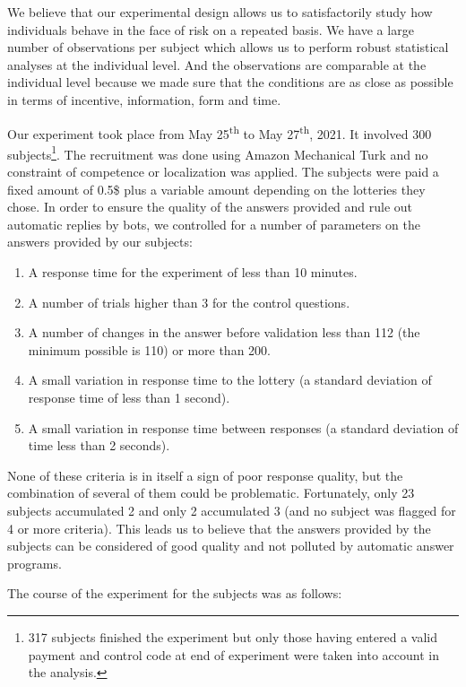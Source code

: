 \documentclass[
]{book}
\providecommand{\tightlist}{%
  \setlength{\itemsep}{0pt}\setlength{\parskip}{0pt}}
\begin{document}
We believe that our experimental design allows us to satisfactorily
study how individuals behave in the face of risk on a repeated basis. We
have a large number of observations per subject which allows us to
perform robust statistical analyses at the individual level. And the
observations are comparable at the individual level because we made sure
that the conditions are as close as possible in terms of incentive,
information, form and time.

Our experiment took place from May 25\textsuperscript{th} to May 27\textsuperscript{th}, 2021.
It involved 300 subjects\footnote{317 subjects finished the experiment but only those
  having entered a valid payment and control code at end of experiment were taken into
  account in the analysis.}.
The recruitment was done using Amazon Mechanical Turk and no
constraint of competence or localization was applied.
The subjects were
paid a fixed amount of 0.5\$ plus a variable amount depending on the
lotteries they chose.
In order to ensure the quality of the answers provided
and rule out automatic replies by bots,
we controlled for a number of parameters on the answers provided by
our subjects:

\begin{enumerate}
\def\labelenumi{\arabic{enumi}.}
\tightlist
\item
  A response time for the experiment of less than 10 minutes.
\item
  A number of trials higher than 3 for the control questions.
\item
  A number of changes in the answer before validation less than 112
  (the minimum possible is 110) or more than 200.
\item
  A small variation in response time to the lottery (a standard
  deviation of response time of less than 1 second).
\item
  A small variation in response time between responses (a standard
  deviation of time less than 2 seconds).
\end{enumerate}

None of these criteria is in itself a sign of poor response quality, but
the combination of several of them could be problematic.
Fortunately, only 23 subjects accumulated 2 and only 2 accumulated 3 (and no
subject was flagged for 4 or more criteria).
This leads us to believe that the answers provided by the
subjects can be considered of good quality and not polluted by
automatic answer programs.

The course of the experiment for the subjects was as follows:
\end{document}
